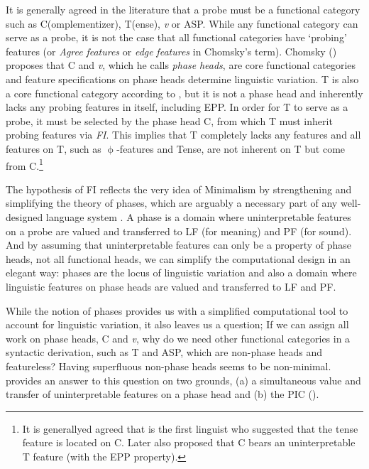 It is generally agreed in the literature that a probe must be a functional category such as C(omplementizer), T(ense), \textit{v} or \ac{ASP}. While any functional category can serve as a probe, it is not the case that all functional categories have ‘probing’ features (or \textit{Agree} \textit{features} or \textit{edge} \textit{features} in Chomsky’s term). Chomsky (\citeyear{Chomsky2000,Chomsky2001,Chomsky2006,Chomsky2008}) proposes that C and \textit{v}, which he calls \textit{phase} \textit{heads}, are core functional categories and feature specifications on phase heads determine linguistic variation. T is also a core functional category according to \citet[102]{Chomsky2000}, but it is not a phase head and inherently lacks any probing features in itself, including \ac{EPP}. In order for T to serve as a probe, it must be selected by the phase head C, from which T must inherit probing features via \textit{\acf{FI}}. This implies that T completely lacks any features and all features on T, such as $\upphi$-features and Tense, are not inherent on T but come from C.\footnote{It is generallyed agreed that \citet{DenBesten1983} is the first linguist who suggested that the tense feature is located on C. Later \citet{PesetskyTorrego2001} also proposed that C bears an uninterpretable T feature (with the \ac{EPP} property).}  

The hypothesis of \ac{FI} reflects the very idea of Minimalism by strengthening and simplifying the theory of phases, which are arguably a necessary part of any well-designed language system \citep{Richards2007}. A phase is a domain where uninterpretable features on a probe are valued and transferred to \ac{LF} (for meaning) and \ac{PF} (for sound). And by assuming that uninterpretable features can only be a property of phase heads, not all functional heads, we can simplify the computational design in an elegant way: phases are the locus of linguistic variation and also a domain where linguistic features on phase heads are valued and transferred to \ac{LF} and \ac{PF}. 

While the notion of phases provides us with a simplified computational tool to account for linguistic variation, it also leaves us a question; If we can assign all work on phase heads, C and \textit{v}, why do we need other functional categories in a syntactic derivation, such as T and \ac{ASP}, which are non-phase heads and featureless? Having superfluous non-phase heads seems to be non-minimal. \citet{Richards2007} provides an answer to this question on two grounds, (a) a simultaneous value and transfer of uninterpretable features on a phase head and (b) the \ac{PIC}  (\citealt[108]{Chomsky2000}).

